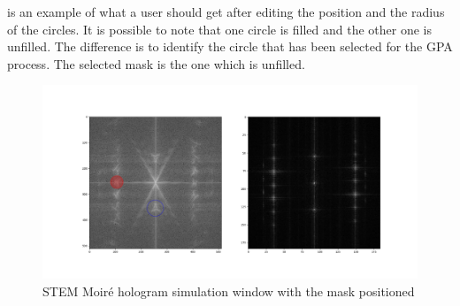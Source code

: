 \documentclass[12pt, titlepage]{article}
\begin{document}
 is an example of what a user should get after editing the position and the radius of the circles. It is possible to note that one circle is filled and the other one is unfilled. The difference is to identify the circle that has been selected for the GPA process. The selected mask is the one which is unfilled. 

\begin{figure}[H]
\centering
\includegraphics[scale=0.35]{Figures/SMH_Simulation-1.png}
\caption{STEM Moir{\'e} hologram simulation window with the mask positioned}
\label{fig:SMH_Simulation_1}
\end{figure}




\end{document}

